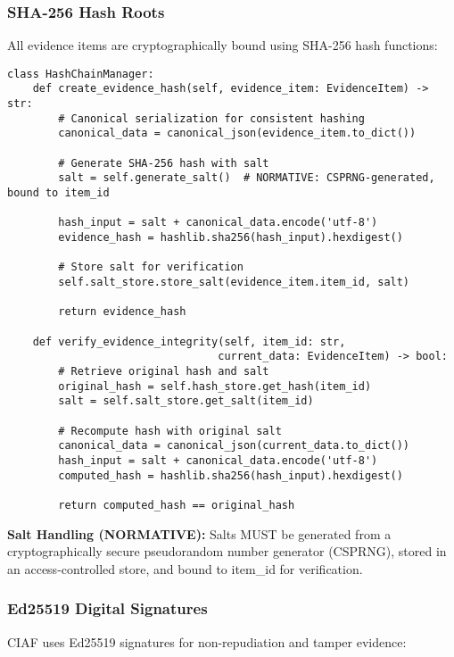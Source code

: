 \documentclass[12pt,a4paper]{article}
\begin{document}
\subsubsection{SHA-256 Hash Roots}

All evidence items are cryptographically bound using SHA-256 hash functions:

\begin{lstlisting}[caption=Hash Chain Implementation]
class HashChainManager:
    def create_evidence_hash(self, evidence_item: EvidenceItem) -> str:
        # Canonical serialization for consistent hashing
        canonical_data = canonical_json(evidence_item.to_dict())
        
        # Generate SHA-256 hash with salt
        salt = self.generate_salt()  # NORMATIVE: CSPRNG-generated, bound to item_id

        hash_input = salt + canonical_data.encode('utf-8')
        evidence_hash = hashlib.sha256(hash_input).hexdigest()
        
        # Store salt for verification
        self.salt_store.store_salt(evidence_item.item_id, salt)
        
        return evidence_hash
    
    def verify_evidence_integrity(self, item_id: str, 
                                 current_data: EvidenceItem) -> bool:
        # Retrieve original hash and salt
        original_hash = self.hash_store.get_hash(item_id)
        salt = self.salt_store.get_salt(item_id)
        
        # Recompute hash with original salt
        canonical_data = canonical_json(current_data.to_dict())
        hash_input = salt + canonical_data.encode('utf-8')
        computed_hash = hashlib.sha256(hash_input).hexdigest()
        
        return computed_hash == original_hash
\end{lstlisting}

\textbf{Salt Handling (NORMATIVE):} Salts MUST be generated from a cryptographically secure pseudorandom number generator (CSPRNG), stored in an access-controlled store, and bound to item\_id for verification.

\subsubsection{Ed25519 Digital Signatures}

CIAF uses Ed25519 signatures for non-repudiation and tamper evidence:
\end{document}
